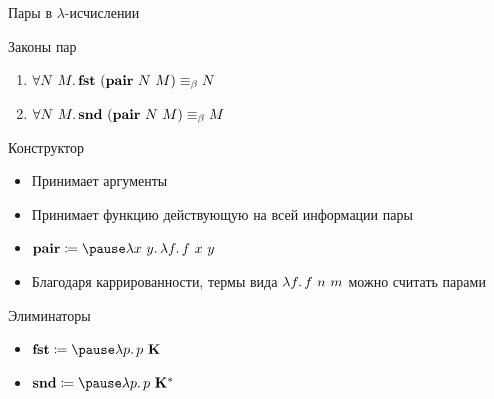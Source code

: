     \begin{frame}[fragile]{Пары в $\lambda$-исчислении}
        \begin{block}{Законы пар}
            \begin{enumerate}
                \item $\forall N~M\ldotp \mathbf{fst}~(\mathbf{pair}~N~M) \equiv_\beta N$
                \item $\forall N~M\ldotp \mathbf{snd}~(\mathbf{pair}~N~M) \equiv_\beta M$
            \end{enumerate}
        \end{block}
        \pause
        \begin{block}{Конструктор}
            \begin{itemize}
                \item Принимает аргументы
                \item Принимает функцию действующую на всей информации пары
                \item $\term{pair} \termdef \pause \lambda x~y\ldotp \lambda f \ldotp f \ap x \ap y$
                \item Благодаря каррированности, термы вида $\lambda f\ldotp f ~ n ~ m$ можно считать парами
            \end{itemize}
        \end{block}
        \pause
        \begin{block}{Элиминаторы}
            \begin{itemize}
                \item $\term{fst} \termdef \pause \lambda p \ldotp p \ap \term{K}$
                \item $\term{snd} \termdef \pause \lambda p \ldotp p \ap \term{K}^*$
            \end{itemize}
        \end{block}
    \end{frame}

